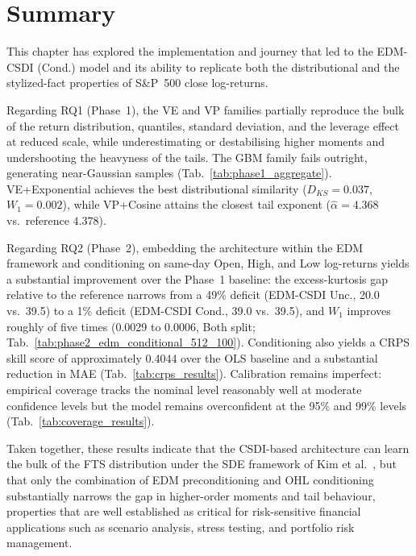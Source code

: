 \section{Summary}
This chapter has explored the implementation and journey that led to the EDM-CSDI (Cond.) model and its ability to replicate both the distributional and the stylized-fact properties of S\&P~500 close log-returns.

Regarding RQ1 (Phase~1), the VE and VP families partially reproduce the bulk of the return distribution, quantiles, standard deviation, and the leverage effect at reduced scale, while underestimating or destabilising higher moments and undershooting the heavyness of the tails. The GBM family fails outright, generating near-Gaussian samples (Tab.\ \ref{tab:phase1_aggregate}). VE+Exponential achieves the best distributional similarity (\(D_{KS}=0.037\), \(W_1=0.002\)), while VP+Cosine attains the closest tail exponent (\(\hat{\alpha}=4.368\) vs.\ reference \(4.378\)).

Regarding RQ2 (Phase~2), embedding the architecture within the EDM framework and conditioning on same-day Open, High, and Low log-returns yields a substantial improvement over the Phase~1 baseline: the excess-kurtosis gap relative to the reference narrows from a 49\% deficit (EDM-CSDI Unc., 20.0 vs.\ 39.5) to a 1\% deficit (EDM-CSDI Cond., 39.0 vs.\ 39.5), and \(W_1\) improves roughly of five times (0.0029 to 0.0006, Both split; Tab.\ \ref{tab:phase2_edm_conditional_512_100}). Conditioning also yields a CRPS skill score of approximately 0.4044 over the OLS baseline and a substantial reduction in MAE (Tab.\ \ref{tab:crps_results}). Calibration remains imperfect: empirical coverage tracks the nominal level reasonably well at moderate confidence levels but the model remains overconfident at the 95\% and 99\% levels (Tab.\ \ref{tab:coverage_results}).

Taken together, these results indicate that the CSDI-based architecture can 
learn the bulk of the FTS distribution under the SDE framework of Kim et al.\ 
\cite{kim2025diffusion}, but that only the combination of EDM preconditioning 
and OHL conditioning substantially narrows the gap in higher-order moments and 
tail behaviour, properties that are well established as critical for 
risk-sensitive financial applications such as scenario analysis, stress testing, 
and portfolio risk management.  